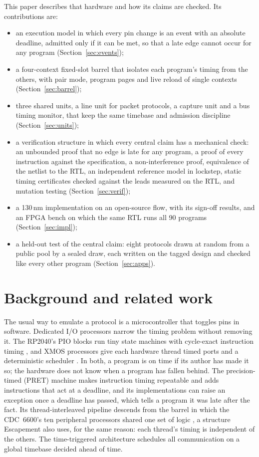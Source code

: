 \documentclass[conference,letterpaper]{IEEEtran}
\begin{document}
This paper describes that hardware and how its claims are checked. Its contributions are:
\begin{itemize}
\item an execution model in which every pin change is an event with an absolute deadline,
  admitted only if it can be met, so that a late edge cannot occur for any program
  (Section~\ref{sec:events});
\item a four-context fixed-slot barrel that isolates each program's timing from the
  others, with pair mode, program pages and live reload of single contexts
  (Section~\ref{sec:barrel});
\item three shared units, a line unit for packet protocols, a capture unit and a bus
  timing monitor, that keep the same timebase and admission discipline
  (Section~\ref{sec:units});
\item a verification structure in which every central claim has a mechanical check: an
  unbounded proof that no edge is late for any program, a proof of every instruction
  against the specification, a non-interference proof,
  equivalence of the netlist to the RTL, an independent reference model in lockstep,
  static timing certificates checked against the leads measured on the RTL, and mutation
  testing
  (Section~\ref{sec:verif});
\item a 130\,nm implementation on an open-source flow, with its sign-off results, and an
  FPGA bench on which the same RTL runs all 90 programs (Section~\ref{sec:impl});
\item a held-out test of the central claim: eight protocols drawn at random from a public
  pool by a sealed draw, each written on the tagged design and checked like every other program
  (Section~\ref{sec:apps}).
\end{itemize}

\section{Background and related work}
\label{sec:related}

The usual way to emulate a protocol is a microcontroller that toggles pins in software.
Dedicated I/O processors narrow the timing problem without removing it. The RP2040's PIO
blocks run tiny state machines with cycle-exact instruction timing \cite{rp2040}, and
XMOS processors give each hardware thread timed ports and a deterministic scheduler
\cite{xmos}. In both, a program is on time if its author has made it so; the hardware
does not know when a program has fallen behind. The precision-timed (PRET) machine
\cite{pret,pretimpl} makes instruction timing repeatable and adds instructions that act at
a deadline, and its implementations can raise an exception once a deadline has passed,
which tells a program it was late after the fact. Its thread-interleaved pipeline
descends from the barrel in which the CDC~6600's ten peripheral processors shared one
set of logic \cite{cdc6600}, a structure Escapement also uses, for the same reason: each thread's timing is independent of the others. The time-triggered
architecture \cite{tta} schedules all communication on a global timebase decided ahead
of time.
\end{document}
